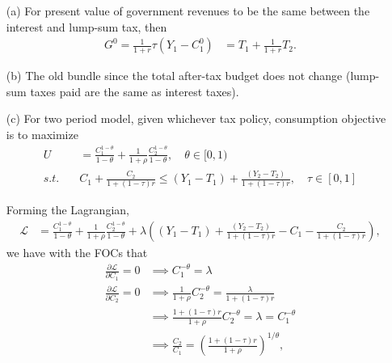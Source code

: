\documentclass{article}
\renewcommand{\L}{\mathcal{L}}
\begin{document}
        \begin{itemize}
            \item[(a)]
            For present value of government revenues to be the same between the interest and lump-sum tax, then
            \begin{align}
                G^0 = \frac{1}{1+r} \tau (Y_1 - C_1^0)
                &= T_1 + \frac{1}{1+r} T_2.
            \end{align}
            
            
            \item[(b)]
            The old bundle  since the total after-tax budget does not change (lump-sum taxes paid are the same as interest taxes).
            
            
            
            
            \item[(c)]
            For two period model, given whichever tax policy, consumption objective is to maximize
            \begin{align}
                U &= \frac{C_1^{1-\theta}}{1-\theta} + \frac{1}{1+\rho} \frac{C_2^{1-\theta}}{1-\theta},
                \quad \theta \in [0, 1)
                \\ s.t. \quad &
                C_1 + \frac{C_2}{1 + (1-\tau)r}
                \le 
                (Y_1 - T_1) + \frac{(Y_2 - T_2)}{1 + (1-\tau)r},
                \quad \tau \in [0, 1]
            \end{align}
            
            Forming the Lagrangian,
            \begin{align}
                \L
                &= \frac{C_1^{1-\theta}}{1-\theta} + \frac{1}{1+\rho} \frac{C_2^{1-\theta}}{1-\theta}
                + \lambda \left( (Y_1 - T_1) + \frac{(Y_2 - T_2)}{1 + (1-\tau)r} - C_1 - \frac{C_2}{1 + (1-\tau)r} \right),
            \end{align}
            we have with the FOCs that
            \begin{align}
                \frac{\partial \L}{\partial C_1} = 0
                &\implies
                C_1^{-\theta} = \lambda \\
                \frac{\partial \L}{\partial C_2} = 0
                &\implies
                \frac{1}{1+\rho}C_2^{-\theta} = \frac{\lambda}{1 + (1-\tau)r}
                \\ &\implies
                \frac{1 + (1-\tau)r}{1+\rho}C_2^{-\theta} = \lambda  = C_1^{-\theta}
                \\ &\implies
                \frac{C_2}{C_1} = \left(\frac{1 + (1-\tau)r}{1+\rho}\right)^{1/\theta},
            \end{align}
            

\end{itemize}
\end{document}
